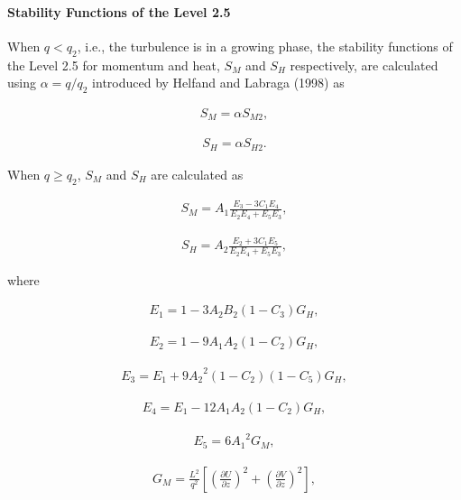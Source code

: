 \hypertarget{stability-functions-of-the-level-2.5}{%
\paragraph{Stability Functions of the Level 2.5}\label{stability-functions-of-the-level-2.5}}

When \(q<q_2\), i.e., the turbulence is in a growing phase, the stability functions of the Level 2.5 for momentum and heat, \(S_M\) and \(S_H\) respectively, are calculated using \(\alpha=q/q_2\)
introduced by Helfand and Labraga (1998) as

\begin{eqnarray}S_M=\alpha S_{M2},\end{eqnarray}

\begin{eqnarray}S_H=\alpha S_{H2}.\end{eqnarray}

When \(q \geq q_2\), \(S_M\) and \(S_H\) are calculated as

\begin{eqnarray}S_M=A_1\frac{E_3-3C_1 E_4}{E_2 E_4+E_5 E_3},\end{eqnarray}

\begin{eqnarray}S_H=A_2\frac{E_2+3C_1 E_5}{E_2 E_4+E_5 E_3},\end{eqnarray}

where

\begin{eqnarray}E_1=1-3A_2B_2(1-C_3)G_H,\end{eqnarray}

\begin{eqnarray}E_2=1-9A_1A_2(1-C_2)G_H,\end{eqnarray}

\begin{eqnarray}E_3=E_1+9{A_2}^2(1-C_2)(1-C_5)G_H,\end{eqnarray}

\begin{eqnarray}E_4=E_1-12A_1A_2(1-C_2)G_H,\end{eqnarray}

\begin{eqnarray}E_5=6{A_1}^2G_M,\end{eqnarray}

\begin{eqnarray}G_M=\frac{L^2}{q^2}\left[\left(\frac{\partial U}{\partial z}\right)^2+\left(\frac{\partial V}{\partial z}\right)^2\right],\end{eqnarray}

